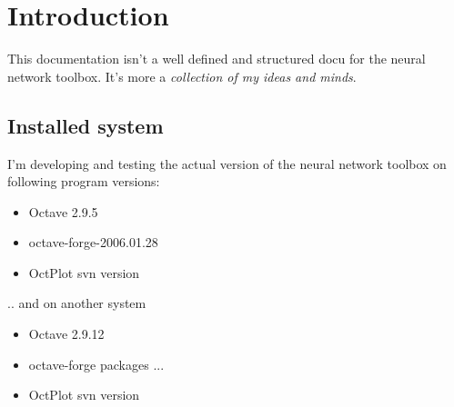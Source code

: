 \chapter{Introduction}
This documentation isn't a well defined and structured docu for the neural network toolbox.
It's more a \textit{collection of my ideas and minds}.


\section{Installed system}
I'm developing and testing the actual version of the neural network toolbox on following 
program versions:

\begin{itemize}
  \item Octave 2.9.5
  \item octave-forge-2006.01.28
  \item OctPlot svn version
\end{itemize}

.. and on another system

\begin{itemize}
  \item Octave 2.9.12
  \item octave-forge packages ...
  \item OctPlot svn version
\end{itemize}






